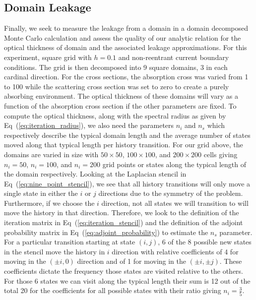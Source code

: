 \documentclass{mc2013}
\begin{document}
\subsection{Domain Leakage}
\label{subsec:domain_leakage}

Finally, we seek to measure the leakage from a domain in a domain
decomposed Monte Carlo calculation and assess the quality of our
analytic relation for the optical thickness of domain and the
associated leakage approximations. For this experiment, square grid
with $h=0.1$ and non-reentrant current boundary conditions. The grid
is then decomposed into 9 square domains, 3 in each cardinal
direction. For the cross sections, the absorption cross was varied
from 1 to 100 while the scattering cross section was set to zero to
create a purely absorbing environment. The optical thickness of these
domains will vary as a function of the absorption cross section if the
other parameters are fixed. To compute the optical thickness, along
with the spectral radius as given by Eq~(\ref{eq:iteration_radius}),
we also need the parameters $n_i$ and $n_s$ which respectively
describe the typical domain length and the average number of states
moved along that typical length per history transition. For our grid
above, the domains are varied in size with $50 \times 50$, $100 \times
100$, and $200 \times 200$ cells giving $n_i=50$, $n_i=100$, and
$n_i=200$ grid points or states along the typical length of the domain
respectively. Looking at the Laplacian stencil in
Eq~(\ref{eq:nine_point_stencil}), we see that all history transitions
will only move a single state in either the $i$ or $j$ directions due
to the symmetry of the problem. Furthermore, if we choose the $i$
direction, not all states we will transition to will move the history
in that direction. Therefore, we look to the definition of the
iteration matrix in Eq~(\ref{eq:iteration_stencil}) and the definition
of the adjoint probability matrix in Eq~(\ref{eq:adjoint_probability})
to estimate the $n_s$ parameter. For a particular transition starting
at state $(i,j)$, 6 of the 8 possible new states in the stencil move
the history in $i$ direction with relative coefficients of 4 for
moving in the $(\pm i,0)$ direction and of 1 for moving in the $(\pm
i,\pm j)$. These coefficients dictate the frequency those states are
visited relative to the others. For those 6 states we can visit along
the typical length their sum is 12 out of the total 20 for the
coefficients for all possible states with their ratio giving $n_i =
\frac{3}{5}$.
\end{document}
